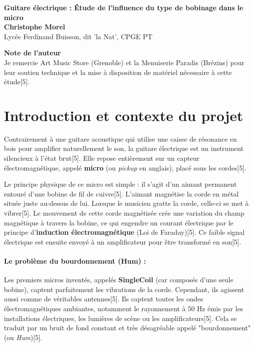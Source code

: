 \documentclass[11pt, a4paper]{article}
\begin{document}
\begin{titlepage}
    \vspace*{\fill}
    \begin{center}
        {\Huge \textbf{Guitare électrique : Étude de l'influence du type de bobinage dans le micro}} \\[2cm]
        {\Large \textbf{Christophe Morel}} \\[0.5cm]
        {\large Lycée Ferdinand Buisson, dit 'la Nat', CPGE PT} \\[3cm]
    \end{center}
    
    \textbf{Note de l'auteur} \\
    Je remercie Art Music Store (Grenoble) et la Menuiserie Paradis (Brézins) pour leur soutien technique et la mise à disposition de matériel nécessaire à cette étude[5].
    \vspace*{\fill}
\end{titlepage}

\newpage

\section*{Introduction et contexte du projet}

Contrairement à une guitare acoustique qui utilise une caisse de résonance en bois pour amplifier naturellement le son, la guitare électrique est un instrument silencieux à l'état brut[5]. Elle repose entièrement sur un capteur électromagnétique, appelé \textbf{micro} (ou \textit{pickup} en anglais), placé sous les cordes[5]. 

Le principe physique de ce micro est simple : il s'agit d'un aimant permanent entouré d'une bobine de fil de cuivre[5]. L'aimant magnétise la corde en métal située juste au-dessus de lui. Lorsque le musicien gratte la corde, celle-ci se met à vibrer[5]. Le mouvement de cette corde magnétisée crée une variation du champ magnétique à travers la bobine, ce qui engendre un courant électrique par le principe d'\textbf{induction électromagnétique} (Loi de Faraday)[5]. Ce faible signal électrique est ensuite envoyé à un amplificateur pour être transformé en son[5].

\paragraph{Le problème du bourdonnement (Hum) :}
Les premiers micros inventés, appelés \textbf{SingleCoil} (car composés d'une seule bobine), captent parfaitement les vibrations de la corde. Cependant, ils agissent aussi comme de véritables antennes[5]. Ils captent toutes les ondes électromagnétiques ambiantes, notamment le rayonnement à 50 Hz émis par les installations électriques, les lumières de scène ou les amplificateurs[5]. Cela se traduit par un bruit de fond constant et très désagréable appelé "bourdonnement" (ou \textit{Hum})[5].
\end{document}
